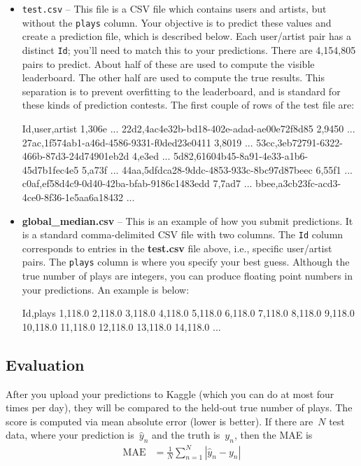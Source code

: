 \documentclass[12pt]{article}
\begin{document}
\begin{itemize}
\item \verb|test.csv| -- This file is a CSV file which contains users and artists, but without the \texttt{plays} column.  Your objective is to predict these values and create a prediction file, which is described below.  Each user/artist pair has a distinct \texttt{Id}; you'll need to match this to your predictions.  There are 4,154,805 pairs to predict.  About half of these are used to compute the visible leaderboard.  The other half are used to compute the true results.  This separation is to prevent overfitting to the leaderboard, and is standard for these kinds of prediction contests.  The first couple of rows of the test file are:
\begin{csv}
Id,user,artist
1,306e ... 22d2,4ac4e32b-bd18-402e-adad-ae00e72f8d85
2,9450 ... 27ac,1f574ab1-a46d-4586-9331-f0ded23e0411
3,8019 ... 53cc,3eb72791-6322-466b-87d3-24d74901eb2d
4,e3ed ... 5d82,61604b45-8a91-4e33-a1b6-45d7b1fec4e5
5,a73f ... 44aa,5dfdca28-9ddc-4853-933c-8bc97d87beec
6,55f1 ... c0af,ef58d4c9-0d40-42ba-bfab-9186c1483edd
7,7ad7 ... bbee,a3cb23fc-acd3-4ce0-8f36-1e5aa6a18432
...
\end{csv}

\item \textbf{global\_median.csv} -- This is an example of how you submit predictions.  It is a standard comma-delimited CSV file with two columns.  The \texttt{Id} column corresponds to entries in the \textbf{test.csv} file above, i.e., specific user/artist pairs.  The \texttt{plays} column is where you specify your best guess.  Although the true number of plays are integers, you can produce floating point numbers in your predictions.  An example is below:
\begin{csv}
Id,plays
1,118.0
2,118.0
3,118.0
4,118.0
5,118.0
6,118.0
7,118.0
8,118.0
9,118.0
10,118.0
11,118.0
12,118.0
13,118.0
14,118.0
...
\end{csv}

\end{itemize}

\subsection*{Evaluation}
After you upload your predictions to Kaggle (which you can do at most four times per day), they will be compared to the held-out true number of plays.  The score is computed via mean absolute error (lower is better).  If there are~$N$ test data, where your prediction is~$\hat{y}_n$ and the truth is~$y_n$, then the MAE is
\begin{align*}
\text{MAE} &= \frac{1}{N}\sum_{n=1}^N|\hat{y}_n-y_n|
\end{align*}
\end{document}
